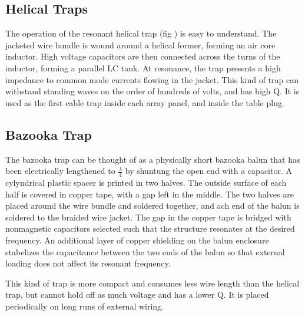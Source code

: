 \subsection{Helical Traps}
The operation of the resonant helical trap (fig \cite{helical_trap}) is easy to understand.  The jacketed wire bundle is
wound around a helical former, forming an air core inductor. High voltage capacitors are then connected across the turns
of the inductor, forming a parallel LC tank. At resonance, the trap presents a high impedance to common mode currents flowing in the jacket. 
This kind of trap can withstand standing waves on the order of hundreds of volts, and has high Q. It is used as the first cable trap inside each array panel, and inside the table plug.

\subsection{Bazooka Trap}
The bazooka trap can be thought of as a physically short bazooka balun that has been electrically lengthened to $\frac{\lambda}{4}$ by shuntung the open end with a capacitor. A cylyndrical plastic spacer is printed in two halves. The outside surface of each half is covered in copper tape, with a gap left in the middle. The two halves are placed around the wire bundle and soldered together, and ach end of the balun is soldered to the braided wire jacket. The gap in the copper tape is bridged with nonmagnetic capacitors selected such that the structure resonates at the desired frequency. An additional layer of copper shielding on the balun enclosure stabelizes the capacitance between the two ends of the balun so that external loading does not affect its resonant frequency.

This kind of trap is more compact and consumes less wire length than the helical trap, but cannot hold off as much voltage and has a lower Q.  It is placed periodically on long runs of external wiring.

